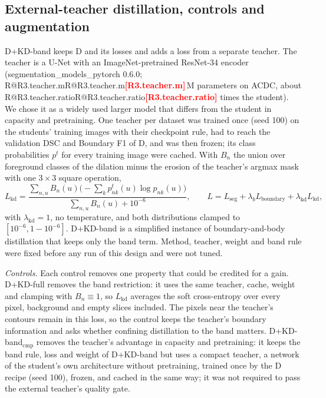 \documentclass[fleqn,10pt,lineno]{wlpeerj}
\makeatletter
\newcommand{\R}[1]{\ifcsname R@#1\endcsname\csname R@#1\endcsname\else\textbf{\textcolor{red}{[#1]}}\fi}
\makeatother
\begin{document}
\subsection*{External-teacher distillation, controls and augmentation}
D+KD-band keeps D and its losses and adds a loss from a separate teacher. The teacher is a U-Net with an ImageNet-pretrained ResNet-34 encoder (segmentation\_models\_pytorch 0.6.0; \R{R3.teacher.m}\,M parameters on ACDC, about \R{R3.teacher.ratio} times the student). We chose it as a widely used larger model that differs from the student in capacity and pretraining. One teacher per dataset was trained once (seed 100) on the students' training images with their checkpoint rule, had to reach the validation DSC and Boundary F1 of D, and was then frozen; its class probabilities $p^{t}$ for every training image were cached. With $B_n$ the union over foreground classes of the dilation minus the erosion of the teacher's argmax mask with one $3\times3$ square operation,
\begin{equation}
L_{\mathrm{kd}}=\frac{\sum_{n,u}B_n(u)\bigl(-\sum_k p^{t}_{nk}(u)\log p_{nk}(u)\bigr)}{\sum_{n,u}B_n(u)+10^{-6}},\qquad L=L_{\mathrm{seg}}+\lambda_bL_{\mathrm{boundary}}+\lambda_{\mathrm{kd}}L_{\mathrm{kd}},
\label{eq:kd}
\end{equation}
with $\lambda_{\mathrm{kd}}=1$, no temperature, and both distributions clamped to $[10^{-6},1-10^{-6}]$. D+KD-band is a simplified instance of boundary-and-body distillation \citep{Liu2024BPKD} that keeps only the band term. Method, teacher, weight and band rule were fixed before any run of this design and were not tuned.

\emph{Controls.} Each control removes one property that could be credited for a gain. D+KD-full removes the band restriction: it uses the same teacher, cache, weight and clamping with $B_n\equiv1$, so $L_{\mathrm{kd}}$ averages the soft cross-entropy over every pixel, background and empty slices included. The pixels near the teacher's contours remain in this loss, so the control keeps the teacher's boundary information and asks whether confining distillation to the band matters. D+KD-band$_{\mathrm{cmp}}$ removes the teacher's advantage in capacity and pretraining: it keeps the band rule, loss and weight of D+KD-band but uses a compact teacher, a network of the student's own architecture without pretraining, trained once by the D recipe (seed 100), frozen, and cached in the same way; it was not required to pass the external teacher's quality gate.
\end{document}
